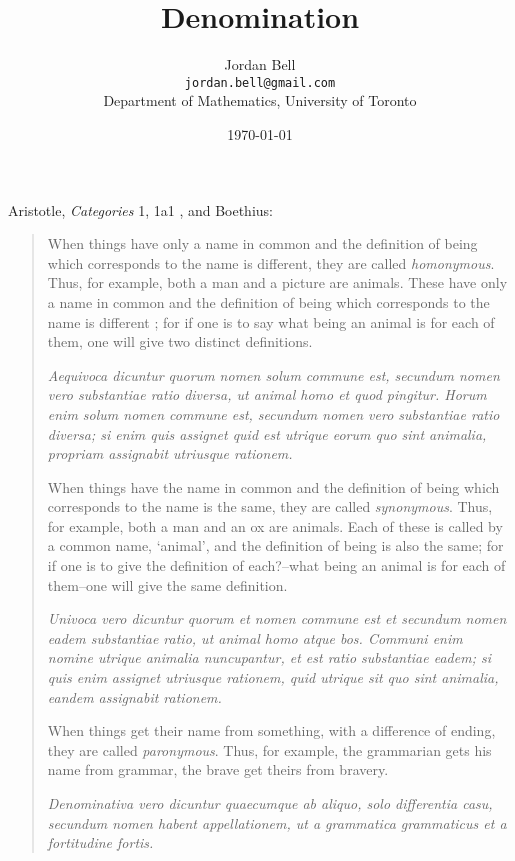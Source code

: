 \documentclass{article}
\begin{document}
\title{Denomination}
\author{Jordan Bell\\ \texttt{jordan.bell@gmail.com}\\Department of Mathematics, University of Toronto}
\date{\today}

\maketitle

Aristotle, {\em Categories} 1, 1a1 \cite[p.~3]{ackrill}, and Boethius:

\begin{quote}
When things have only a name in common and the definition of being which corresponds to the name is different, they are called {\em homonymous}. Thus, for example, both a man and a picture are animals. These have only a name in common and the definition of being which corresponds to the name is different ; for if one is to say what being an animal is for each of them, one will give
two distinct definitions.

{\em Aequivoca dicuntur quorum nomen solum commune est, secundum nomen vero substantiae ratio diversa, ut animal homo et quod pingitur. Horum enim solum nomen commune est, secundum nomen vero substantiae ratio diversa; si enim quis assignet quid est utrique eorum quo sint animalia, propriam assignabit utriusque rationem.}

When things have the name in common and the definition of being which corresponds to the name is the same, they are called {\em synonymous}. Thus, for example, both a man and an ox are animals. Each of these is called by a common name, `animal', and the definition of being is also the same; for if one is to give the definition of each?--what being an animal is for each of them--one will give
the same definition.

{\em Univoca vero dicuntur quorum et nomen commune est et secundum nomen eadem substantiae ratio, ut animal homo atque bos. Communi enim nomine utrique animalia nuncupantur, et est ratio substantiae eadem; si quis enim assignet utriusque rationem, quid utrique sit quo sint animalia, eandem assignabit rationem.}

When things get their name from something, with a difference of ending, they are called {\em paronymous}. Thus, for example, the grammarian gets his name from grammar, the brave get theirs from bravery.

{\em Denominativa vero dicuntur quaecumque ab aliquo, solo differentia casu, secundum nomen habent appellationem, ut a grammatica grammaticus et a fortitudine fortis.}
\end{quote}
\end{document}
